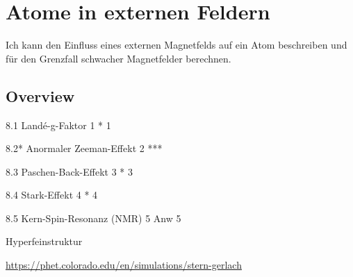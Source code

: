 \renewcommand{\lastmod}{10. September 2024}
\renewcommand{\chapterauthors}{Markus Lippitz}

\chapter{Atome in externen Feldern}





Ich kann den Einfluss eines externen Magnetfelds auf ein Atom beschreiben und für den Grenzfall schwacher Magnetfelder berechnen.

\section{Overview}




8.1 Landé-g-Faktor 1	*	1 

8.2* Anormaler Zeeman-Effekt 2	***

8.3 Paschen-Back-Effekt 3	*	3 

8.4 Stark-Effekt 4	*	4 

8.5 Kern-Spin-Resonanz (NMR) 5	Anw	5 

Hyperfeinstruktur 


\url{https://phet.colorado.edu/en/simulations/stern-gerlach}




\printbibliography[segment=\therefsegment,heading=subbibliography]
